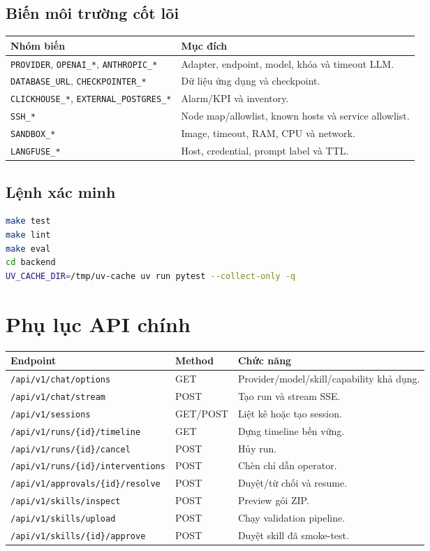 \documentclass[12pt,a4paper]{article}
\begin{document}
\subsection{Biến môi trường cốt lõi}
\begin{longtable}{p{}p{}}
\toprule
\textbf{Nhóm biến} & \textbf{Mục đích} \\
\midrule
\texttt{PROVIDER}, \texttt{OPENAI\_*}, \texttt{ANTHROPIC\_*} & Adapter, endpoint, model, khóa và timeout LLM. \\
\texttt{DATABASE\_URL}, \texttt{CHECKPOINTER\_*} & Dữ liệu ứng dụng và checkpoint. \\
\texttt{CLICKHOUSE\_*}, \texttt{EXTERNAL\_POSTGRES\_*} & Alarm/KPI và inventory. \\
\texttt{SSH\_*} & Node map/allowlist, known hosts và service allowlist. \\
\texttt{SANDBOX\_*} & Image, timeout, RAM, CPU và network. \\
\texttt{LANGFUSE\_*} & Host, credential, prompt label và TTL. \\
\bottomrule
\end{longtable}

\subsection{Lệnh xác minh}
\begin{lstlisting}[language=bash,caption={Các lệnh tái lập quality gate}]
make test
make lint
make eval
cd backend
UV_CACHE_DIR=/tmp/uv-cache uv run pytest --collect-only -q
\end{lstlisting}

\section{Phụ lục API chính}
\small
\begin{longtable}{p{}p{}p{}}
\toprule
\textbf{Endpoint} & \textbf{Method} & \textbf{Chức năng} \\
\midrule
\texttt{/api/v1/chat/options} & GET & Provider/model/skill/capability khả dụng. \\
\texttt{/api/v1/chat/stream} & POST & Tạo run và stream SSE. \\
\texttt{/api/v1/sessions} & GET/POST & Liệt kê hoặc tạo session. \\
\texttt{/api/v1/runs/\{id\}/timeline} & GET & Dựng timeline bền vững. \\
\texttt{/api/v1/runs/\{id\}/cancel} & POST & Hủy run. \\
\texttt{/api/v1/runs/\{id\}/interventions} & POST & Chèn chỉ dẫn operator. \\
\texttt{/api/v1/approvals/\{id\}/resolve} & POST & Duyệt/từ chối và resume. \\
\texttt{/api/v1/skills/inspect} & POST & Preview gói ZIP. \\
\texttt{/api/v1/skills/upload} & POST & Chạy validation pipeline. \\
\texttt{/api/v1/skills/\{id\}/approve} & POST & Duyệt skill đã smoke-test. \\
\bottomrule
\end{longtable}
\end{document}
